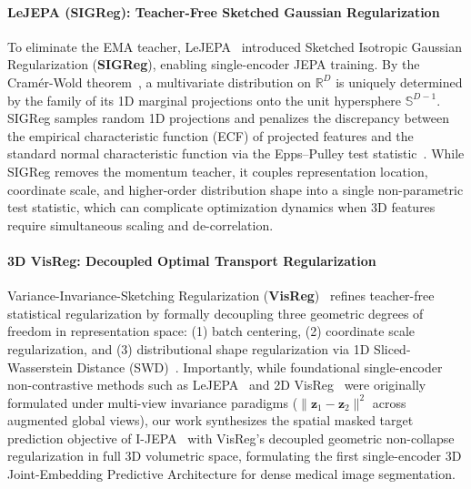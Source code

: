 \documentclass{article}
\begin{document}
\paragraph{LeJEPA (SIGReg): Teacher-Free Sketched Gaussian Regularization}
To eliminate the EMA teacher, LeJEPA~\citep{balestriero2025lejepa} introduced Sketched Isotropic Gaussian Regularization (\textbf{SIGReg}), enabling single-encoder JEPA training. By the Cram\'er-Wold theorem~\citep{cramer1936theorems}, a multivariate distribution on $\mathbb{R}^D$ is uniquely determined by the family of its 1D marginal projections onto the unit hypersphere $\mathbb{S}^{D-1}$. SIGReg samples random 1D projections and penalizes the discrepancy between the empirical characteristic function (ECF) of projected features and the standard normal characteristic function via the Epps--Pulley test statistic~\citep{epps1983test}. While SIGReg removes the momentum teacher, it couples representation location, coordinate scale, and higher-order distribution shape into a single non-parametric test statistic, which can complicate optimization dynamics when 3D features require simultaneous scaling and de-correlation.

\paragraph{3D VisReg: Decoupled Optimal Transport Regularization}
Variance-Invariance-Sketching Regularization (\textbf{VisReg})~\citep{wu2026visreg} refines teacher-free statistical regularization by formally decoupling three geometric degrees of freedom in representation space: (1) batch centering, (2) coordinate scale regularization, and (3) distributional shape regularization via 1D Sliced-Wasserstein Distance (SWD)~\citep{bonneel2015sliced,kolouri2019generalized,villani2009optimal}. Importantly, while foundational single-encoder non-contrastive methods such as LeJEPA~\citep{balestriero2025lejepa} and 2D VisReg~\citep{wu2026visreg} were originally formulated under multi-view invariance paradigms ($\|\mathbf{z}_1 - \mathbf{z}_2\|^2$ across augmented global views), our work synthesizes the spatial masked target prediction objective of I-JEPA~\citep{assran2023ijepa} with VisReg's decoupled geometric non-collapse regularization in full 3D volumetric space, formulating the first single-encoder 3D Joint-Embedding Predictive Architecture for dense medical image segmentation.
\end{document}
